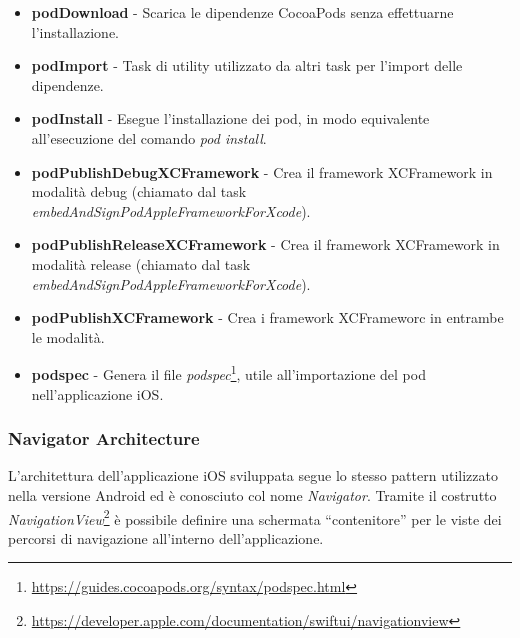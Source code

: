 \begin{itemize}
    \item \textbf{podDownload} - Scarica le dipendenze CocoaPods senza effettuarne l'installazione.
    
    \item \textbf{podImport} - Task di utility utilizzato da altri task per l'import delle dipendenze.
    
    \item \textbf{podInstall} - Esegue l'installazione dei pod, in modo equivalente all'esecuzione del comando \textit{pod install}.
    
    \item \textbf{podPublishDebugXCFramework} - Crea il framework XCFramework in modalità debug (chiamato dal task \textit{embedAndSignPodAppleFrameworkForXcode}).
    
    \item \textbf{podPublishReleaseXCFramework} - Crea il framework XCFramework in modalità release (chiamato dal task \textit{embedAndSignPodAppleFrameworkForXcode}).
    
    \item \textbf{podPublishXCFramework} - Crea i framework XCFrameworc in entrambe le modalità.
    
    \item \textbf{podspec} - Genera il file \textit{podspec}\footnote{\href{https://guides.cocoapods.org/syntax/podspec.html}{https://guides.cocoapods.org/syntax/podspec.html}}, utile all'importazione del pod nell'applicazione iOS.
\end{itemize}

\subsubsection*{Navigator Architecture}
L'architettura dell'applicazione iOS sviluppata segue lo stesso pattern utilizzato nella versione Android ed è conosciuto col nome \textit{Navigator}. 
Tramite il costrutto \textit{NavigationView}\footnote{\href{https://developer.apple.com/documentation/swiftui/navigationview}{https://developer.apple.com/documentation/swiftui/navigationview}} è possibile definire una schermata ``contenitore'' per le viste dei percorsi di navigazione all'interno dell'applicazione.

